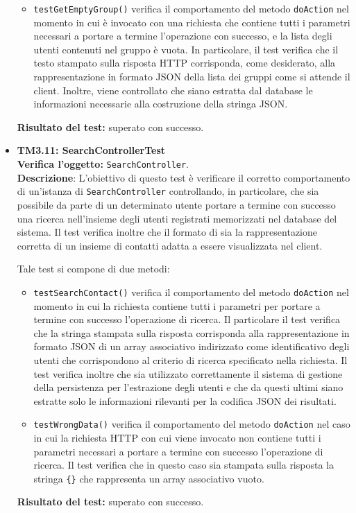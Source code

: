 \begin{itemize}
\begin{itemize}
\item \texttt{testGetEmptyGroup()} verifica il comportamento del metodo \texttt{doAction} nel momento in cui è invocato con una richiesta che contiene tutti i parametri necessari a portare a termine l'operazione con successo, e la lista degli utenti contenuti nel gruppo è vuota. In particolare, il test verifica che il testo stampato sulla risposta HTTP corrisponda, come desiderato, alla rappresentazione in formato JSON della lista dei gruppi come si attende il client. Inoltre, viene controllato che siano estratta dal database le informazioni necessarie alla costruzione della stringa JSON.
\end{itemize}
\textbf{Risultato del test:} superato con successo.


\item[\passed] \textbf{TM3.11: SearchControllerTest}\\
\textbf{Verifica l'oggetto:} \texttt{SearchController}.\\
\textbf{Descrizione}: L'obiettivo di questo test è verificare il corretto comportamento di un'istanza di \texttt{SearchController} controllando, in particolare, che sia possibile da parte di un determinato utente portare a termine con successo una ricerca nell'insieme degli utenti registrati memorizzati nel database del sistema. Il test verifica inoltre che il formato di  sia la rappresentazione corretta di un insieme di contatti adatta a essere visualizzata nel client.

Tale test si compone di due metodi:
\begin{itemize}

\item \texttt{testSearchContact()} verifica il comportamento del metodo \texttt{doAction} nel momento in cui la richiesta contiene tutti i parametri per portare a termine con successo l'operazione di ricerca. Il particolare il test verifica che la stringa stampata sulla risposta corrisponda alla rappresentazione in formato JSON di un array associativo indirizzato come identificativo degli utenti che corrispondono al criterio di ricerca specificato nella richiesta. Il test verifica inoltre che sia utilizzato correttamente il sistema di gestione della persistenza per l'estrazione degli utenti e che da questi ultimi siano estratte solo le informazioni rilevanti per la codifica JSON dei risultati.

\item \texttt{testWrongData()} verifica il comportamento del metodo \texttt{doAction} nel caso in cui la richiesta HTTP con cui viene invocato non contiene tutti i parametri necessari a portare a termine con successo l'operazione di ricerca. Il test verifica che in questo caso sia stampata sulla risposta la stringa \texttt{\{\}} che rappresenta un array associativo vuoto.
\end{itemize}
\textbf{Risultato del test:} superato con successo.



\end{itemize}
